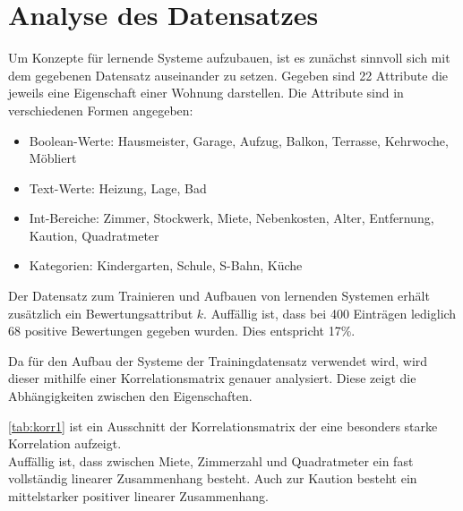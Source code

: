 \section{Analyse des Datensatzes}\label{sec:analyse}
Um Konzepte für lernende Systeme aufzubauen, ist es zunächst sinnvoll sich mit 
dem gegebenen Datensatz auseinander zu setzen. 
Gegeben sind 22 Attribute die jeweils eine Eigenschaft einer Wohnung darstellen. 
Die Attribute sind in verschiedenen Formen angegeben: 
\begin{itemize}
    \item Boolean-Werte: Hausmeister, Garage, Aufzug, Balkon, Terrasse, Kehrwoche, Möbliert
    \item Text-Werte: Heizung, Lage, Bad
    \item Int-Bereiche: Zimmer, Stockwerk, Miete, Nebenkosten, Alter, Entfernung, Kaution, Quadratmeter
    \item Kategorien: Kindergarten, Schule, S-Bahn, Küche
\end{itemize}

Der Datensatz zum Trainieren und Aufbauen von lernenden Systemen erhält zusätzlich 
ein Bewertungsattribut $k$. 
Auffällig ist, dass bei 400 Einträgen lediglich 68 positive Bewertungen gegeben wurden. 
Dies entspricht 17\%. 

Da für den Aufbau der Systeme der Trainingdatensatz verwendet wird, wird dieser mithilfe einer Korrelationsmatrix 
genauer analysiert. Diese zeigt die Abhängigkeiten zwischen den Eigenschaften. 

\autoref{tab:korr1} ist ein Ausschnitt der Korrelationsmatrix der eine besonders starke Korrelation aufzeigt. \\
Auffällig ist, dass zwischen Miete, Zimmerzahl und Quadratmeter ein fast vollständig linearer Zusammenhang
besteht. Auch zur Kaution besteht ein mittelstarker positiver linearer Zusammenhang.

